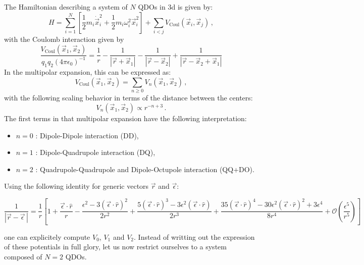 \documentclass[reprint, amsmath, amssymb, aps, prl]{revtex4-2}
\begin{document}
        The Hamiltonian describing a system of $N$ QDOs in 3d is given by:
        \begin{equation}
        \label{eq:full_QDO_Hamiltonian}
            H=\sum_{i=1}^N\left[\frac{1}{2}m_i\dot{\vec x}_i^2 + \frac{1}{2}m_i\omega_i^2\vec x_i^2\right] +\sum_{i<j}V_\text{Coul}\left(\vec x_i, \vec x_j\right)\,,
        \end{equation}
        with the Coulomb interaction given by
        \begin{equation*}
            \frac{V_\text{Coul}\left(\vec x_1, \vec x_2\right)}{q_1q_2(4\pi\epsilon_0)^{-1}}=\frac{1}{r} - \frac{1}{|\vec r + \vec x_1|} - \frac{1}{|\vec r - \vec x_2|} + \frac{1}{|\vec r - \vec x_2 + \vec x_1|}
        \end{equation*}
        In the multipolar expansion, this can be expressed as:
        \begin{equation}
            V_\text{Coul}\left(\vec x_1, \vec x_2\right)= \sum_{n\geq 0} V_n\left(\vec x_1, \vec x_2\right)\,,
        \end{equation}
        with the following scaling behavior in terms of the distance between the centers:
        \begin{equation}
            V_n\left(\vec x_1, \vec x_2\right)\propto r^{-n+3}\,.
        \end{equation}
        The first terms in that multipolar expansion have the following interpretation:
        \begin{itemize}
            \item $n=0$ : Dipole-Dipole interaction (DD),
            \item $n=1$ : Dipole-Quadrupole interaction (DQ),
            \item $n=2$ : Quadrupole-Quadrupole and Dipole-Octupole interaction (QQ+DO).
        \end{itemize}
        Using the following identity for generic vectors $\vec r$ and $\vec \epsilon$:
        \begin{widetext}
        \begin{equation}
            \frac{1}{\left|\vec r - \vec\epsilon\,\right|} = \frac{1}{r}\left[1 + \frac{\vec\epsilon\cdot\hat r}{r} - \frac{\epsilon^2 - 3(\vec\epsilon\cdot\hat r)^2}{2r^2}+\frac{5(\vec\epsilon\cdot\hat r)^3-3\epsilon^2(\vec\epsilon\cdot\hat r)}{2r^3}+\frac{35(\vec\epsilon\cdot\hat r)^4-30\epsilon^2(\vec\epsilon\cdot\hat r)^2+3\epsilon^4}{8r^4}+\mathcal O\left(\frac{\epsilon^5}{r^5}\right)\right]
        \end{equation}
        \end{widetext}
        one can explicitely compute $V_0$, $V_1$ and $V_2$. Instead of writting out the expression of these potentials in full glory, let us now restrict ourselves to a system composed of $N=2$ QDOs.
\end{document}
